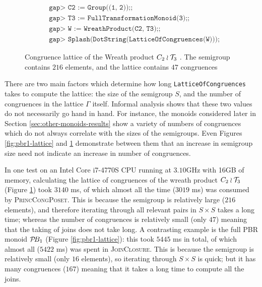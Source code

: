 \begin{figure}[ht]
  \begin{align*}
    &\texttt{gap> C2 := Group((1, 2));;} \\
    &\texttt{gap> T3 := FullTransformationMonoid(3);;} \\
    &\texttt{gap> W := WreathProduct(C2, T3);;} \\
    &\texttt{gap> Splash(DotString(LatticeOfCongruences(W)));}
  \end{align*}
  \vspace{-1.0cm}
  \caption[Congruence lattice of the Wreath product $C_2 \wr \T_3$]
  {Congruence lattice of the Wreath product $C_2 \wr \T_3$
    \cite[\S10.1]{wreath}.  The semigroup contains $216$ elements, and the
    lattice contains $47$ congruences}
  \label{fig:c2-wr-t3-lattice}
\end{figure}

There are two main factors which determine how long
\texttt{LatticeOfCongruences} takes to compute the lattice: the size of the
semigroup $S$, and the number of congruences in the lattice $\Gamma$ itself.
Informal analysis shows that these two values do not necessarily go hand in
hand.  For instance, the monoids considered later in Section
\ref{sec:other-monoids-results} show a variety of numbers of congruences which
do not always correlate with the sizes of the semigroups.  Even Figures
\ref{fig:pbr1-lattice} and \ref{fig:c2-wr-t3-lattice} demonstrate between them
that an increase in semigroup size need not indicate an increase in number of
congruences.

In one test on an Intel Core i7-4770S CPU running at $3.10$GHz with 16GB of
memory, calculating the lattice of congruences of the wreath product
$C_2 \wr \T_3$ (Figure \ref{fig:c2-wr-t3-lattice}) took $3140$ ms, of which
almost all the time ($3019$ ms) was consumed by \textsc{PrincCongPoset}.  This
is because the semigroup is relatively large ($216$ elements), and therefore
iterating through all relevant pairs in $S \times S$ takes a long time; whereas
the number of congruences is relatively small (only $47$) meaning that the
taking of joins does not take long.  A contrasting example is the full PBR
monoid $\mathcal{P}\!B_1$ (Figure \ref{fig:pbr1-lattice}): this took $5445$ ms in total,
of which almost all ($5422$ ms) was spent in \textsc{JoinClosure}.  This is
because the semigroup is relatively small (only $16$ elements), so iterating
through $S \times S$ is quick; but it has many congruences ($167$) meaning that
it takes a long time to compute all the joins.

